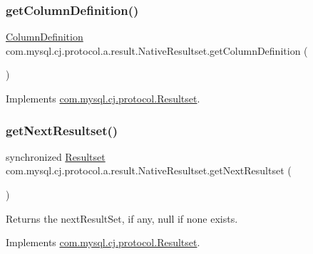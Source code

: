 \subsubsection{\texorpdfstring{get\+Column\+Definition()}{getColumnDefinition()}}
{\footnotesize\ttfamily \mbox{\hyperlink{interfacecom_1_1mysql_1_1cj_1_1protocol_1_1_column_definition}{Column\+Definition}} com.\+mysql.\+cj.\+protocol.\+a.\+result.\+Native\+Resultset.\+get\+Column\+Definition (\begin{DoxyParamCaption}{ }\end{DoxyParamCaption})}



Implements \mbox{\hyperlink{interfacecom_1_1mysql_1_1cj_1_1protocol_1_1_resultset_aa09b585b364b09f418b47bd267b1758b}{com.\+mysql.\+cj.\+protocol.\+Resultset}}.

\mbox{\label{classcom_1_1mysql_1_1cj_1_1protocol_1_1a_1_1result_1_1_native_resultset_a62322ab9154b99ce2ee8c0aca9b90faa}} 
\subsubsection{\texorpdfstring{get\+Next\+Resultset()}{getNextResultset()}}
{\footnotesize\ttfamily synchronized \mbox{\hyperlink{interfacecom_1_1mysql_1_1cj_1_1protocol_1_1_resultset}{Resultset}} com.\+mysql.\+cj.\+protocol.\+a.\+result.\+Native\+Resultset.\+get\+Next\+Resultset (\begin{DoxyParamCaption}{ }\end{DoxyParamCaption})}

\begin{DoxyReturn}{Returns}
the next\+Result\+Set, if any, null if none exists. 
\end{DoxyReturn}


Implements \mbox{\hyperlink{interfacecom_1_1mysql_1_1cj_1_1protocol_1_1_resultset_aeb71f17cb0bbc2c33b47bc7e6a1f750c}{com.\+mysql.\+cj.\+protocol.\+Resultset}}.

\mbox{\label{classcom_1_1mysql_1_1cj_1_1protocol_1_1a_1_1result_1_1_native_resultset_ad10ec652380313c1eb2cb1dd67c4ea7e}} 
